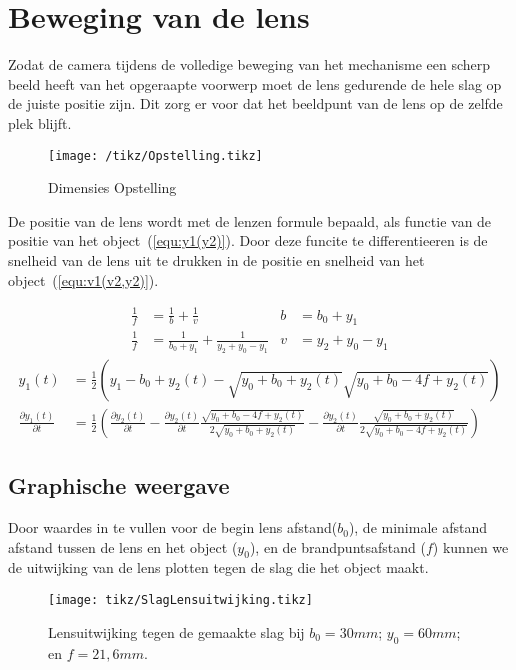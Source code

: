 \section{Beweging van de lens}
Zodat de camera tijdens de volledige beweging van het mechanisme een scherp beeld heeft van het opgeraapte voorwerp moet de lens gedurende de hele slag op de juiste positie zijn. Dit zorg er voor dat het beeldpunt van de lens op de zelfde plek blijft. 
\begin{figure}%
\centering
\texttt{[image: /tikz/Opstelling.tikz]}
\caption{Dimensies Opstelling}
\label{fig:Opstelling}
\end{figure}

De positie van de lens wordt met de lenzen formule bepaald, als functie van de positie van het object~(\ref{equ:y1(y2)}). Door deze funcite te differentieeren is de snelheid van de lens uit te drukken in de positie en snelheid van het object~(\ref{equ:v1(v2,y2)}). 

\begin{align*}
\frac{1}{f}&=\frac{1}{b}+\frac{1}{v}	&	b&=b_{0}+y_{1} \\
\frac{1}{f}&= \frac{1}{b_{0}+y_{1}}+\frac{1}{y_{2}+y_{0}-y_{1}} 	&	v&=y_{2}+y_{0}-y_{1}
\end{align*}
\begin{align}
y_1(t)&=\frac{1}{2}
\left( y_{1}-{b_0} + y_{2}(t) -\sqrt{y_0+b_0+y_2(t)}\sqrt{y_0+b_0-4f+y_2(t)} \right) \label{equ:y1(y2)}\\
\frac{\partial y_1(t)}{\partial t}&=
\frac{1}{2} \left( \frac{\partial y_2(t)}{\partial t} -
\frac{\partial y_2(t)}{\partial t}\frac{\sqrt{y_0+b_0-4f+y_2(t)}}{2\sqrt{y_0+b_0+y_2(t)}} -
\frac{\partial y_2(t)}{\partial t}\frac{\sqrt{y_0+b_0+y_2(t)}}{2\sqrt{y_0+b_0-4f+y_2(t)}} \right) \label{equ:v1(v2,y2)}
\end{align}

\subsection{Graphische weergave}
Door waardes in te vullen voor de begin lens afstand($b_0$), de minimale afstand afstand tussen de lens en het object ($y_0$), en de brandpuntsafstand ($f$) kunnen we de uitwijking van de lens plotten tegen de slag die het object maakt.

\begin{figure}
\centering
	\setlength\figureheight{5cm} 
	\setlength{}
\texttt{[image: tikz/SlagLensuitwijking.tikz]}
\caption[Lensuitwijking tegen de gemaakte slag]{Lensuitwijking tegen de gemaakte slag bij $b_0 = 30mm$; $y_0=60mm$; en $f=21,6mm$.}
\label{fig:SlagLensuitwijking}
\end{figure}

